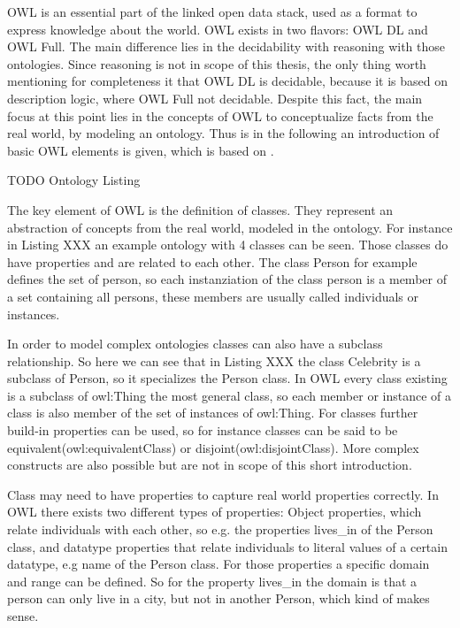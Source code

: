 \documentclass[11pt,titlepage,oneside,openany,a4paper]{report}
\begin{document}
OWL is an essential part of the linked open data stack, used as a format to express knowledge about the world. OWL exists in two flavors: OWL DL and OWL Full. The main difference lies in the decidability with reasoning with those ontologies. Since reasoning is not in scope of this thesis, the only thing worth mentioning for completeness it that OWL DL is decidable, because it is based on description logic, where OWL Full not decidable. Despite this fact, the main focus at this point lies in the concepts of OWL to conceptualize facts from the real world, by modeling an ontology. Thus is in the following an introduction of basic OWL elements is given, which is based on \cite{Antoniou:2012}.

\begin{Huge}
TODO Ontology Listing
\end{Huge}

The key element of OWL is the definition of classes. They represent an abstraction of concepts from the real world, modeled in the ontology. For instance in Listing XXX  an example ontology with 4 classes can be seen. Those classes do have properties and are related to each other. The class Person for example defines the set of person, so each instanziation of the class person is a member of a set containing all persons, these members are usually called individuals or instances.

In order to model complex ontologies classes can also have a subclass relationship. So here we can see that in Listing XXX the class Celebrity is a subclass of Person, so it specializes the Person class. In OWL every class existing is  a subclass of owl:Thing the most general class, so each member or instance of a class is also member of the set of instances of owl:Thing. For classes further build-in properties can be used, so for instance classes can be said to be equivalent(owl:equivalentClass) or disjoint(owl:disjointClass). More complex constructs are also possible but are not in scope of this short introduction.

Class may need to have properties to capture real world properties correctly. In OWL there exists two different types of properties: Object properties, which relate individuals with each other, so e.g. the properties lives\_in of the Person class, and datatype properties that relate individuals to literal values of a certain datatype, e.g name of the Person class. For those properties a specific domain and range can be defined. So for the property lives\_in the domain is that a person can only live in a city, but not in another Person, which kind of makes sense. 
\end{document}
